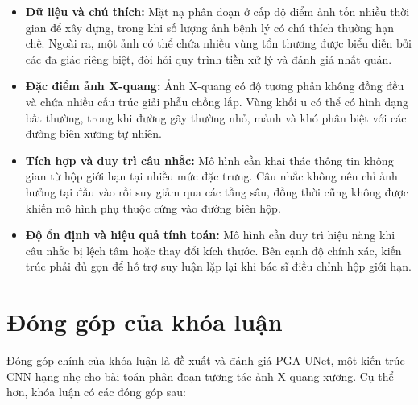 \begin{itemize}
    \item \textbf{Dữ liệu và chú thích:}
    Mặt nạ phân đoạn ở cấp độ điểm ảnh tốn nhiều thời gian để xây dựng, trong khi số lượng ảnh bệnh lý có chú thích thường hạn chế. Ngoài ra, một ảnh có thể chứa nhiều vùng tổn thương được biểu diễn bởi các đa giác riêng biệt, đòi hỏi quy trình tiền xử lý và đánh giá nhất quán.
    \item \textbf{Đặc điểm ảnh X-quang:}
    Ảnh X-quang có độ tương phản không đồng đều và chứa nhiều cấu trúc giải phẫu chồng lấp. Vùng khối u có thể có hình dạng bất thường, trong khi đường gãy thường nhỏ, mảnh và khó phân biệt với các đường biên xương tự nhiên.

    \item \textbf{Tích hợp và duy trì câu nhắc:}
    Mô hình cần khai thác thông tin không gian từ hộp giới hạn tại nhiều mức đặc trưng. Câu nhắc không nên chỉ ảnh hưởng tại đầu vào rồi suy giảm qua các tầng sâu, đồng thời cũng không được khiến mô hình phụ thuộc cứng vào đường biên hộp.

    \item \textbf{Độ ổn định và hiệu quả tính toán:}
    Mô hình cần duy trì hiệu năng khi câu nhắc bị lệch tâm hoặc thay đổi kích thước. Bên cạnh độ chính xác, kiến trúc phải đủ gọn để hỗ trợ suy luận lặp lại khi bác sĩ điều chỉnh hộp giới hạn.
\end{itemize}

\section{Đóng góp của khóa luận}
\label{sec:dong_gop}

Đóng góp chính của khóa luận là đề xuất và đánh giá PGA-UNet, một kiến trúc CNN hạng nhẹ cho bài toán phân đoạn tương tác ảnh X-quang xương. Cụ thể hơn, khóa luận có các đóng góp sau:

